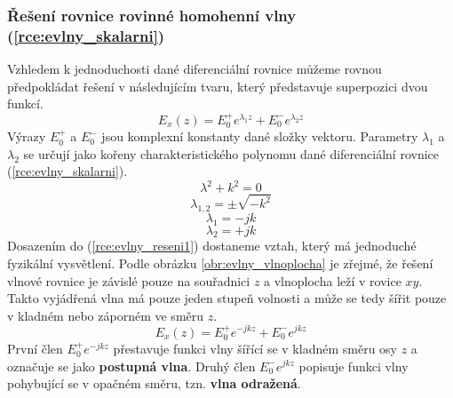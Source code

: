 \subsubsection*{Řešení rovnice rovinné homohenní vlny (\ref{rce:evlny_skalarni})}
Vzhledem k jednoduchosti dané diferenciální rovnice můžeme rovnou předpokládat řešení v následujícím tvaru, který představuje superpozici dvou funkcí.
\begin{equation}
	E_{x}(z) = E_{0}^{+}e^{\lambda_{1}z} +E_{0}^{-}e^{\lambda_{2}z}
	\label{rce:evlny_reseni1}	
\end{equation}
Výrazy $E_{0}^{+}$ a $E_{0}^{-}$ jsou komplexní konstanty dané složky vektoru. Parametry $\lambda_{1}$ a $\lambda_{2}$ se určují jako kořeny charakteristického polynomu dané diferenciální rovnice (\ref{rce:evlny_skalarni}). 
\begin{displaymath}
	\lambda^{2} + k^{2}= 0
\end{displaymath}
\begin{displaymath}
	\lambda_{1,2} = \pm \sqrt{-k^{2}}
\end{displaymath}
\begin{displaymath}
	\lambda_{1} = -jk
\end{displaymath}
\begin{displaymath}
	\lambda_{2} = +jk
\end{displaymath}
Dosazením do (\ref{rce:evlny_reseni1}) dostaneme vztah, který má jednoduché fyzikální vysvětlení. Podle obrázku \ref{obr:evlny_vlnoplocha} je zřejmé, že řešení vlnové rovnice je závislé pouze na souřadnici $z$ a vlnoplocha leží v rovice $xy$. Takto vyjádřená vlna má pouze jeden stupeň volnosti a může se tedy šířit pouze v kladném nebo záporném ve směru $z$.
\begin{equation}
	E_{x}(z) = E_{0}^{+}e^{-jkz} + E_{0}^{-}e^{jkz}
	\label{rce:evlny_reseni2}	
\end{equation}
První člen $ E_{0}^{+}e^{-jkz}$ přestavuje funkci vlny šířící se v kladném směru osy $z$ a označuje se jako {\bf postupná vlna}. Druhý člen $E_{0}^{-}e^{jkz}$ popisuje funkci vlny pohybující se v opačném směru, tzn. {\bf vlna odražená}.

